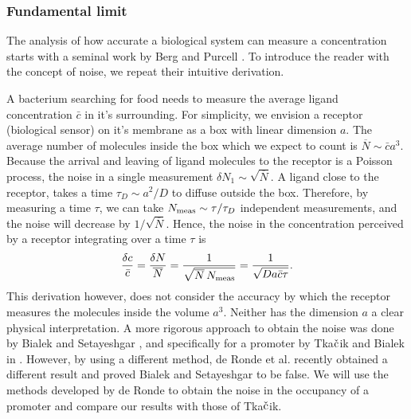 \subsubsection{Fundamental limit}
The analysis of how accurate a biological system can measure a concentration starts with a seminal work by Berg and Purcell \cite{Berg1977}. To introduce the reader with the concept of noise, we repeat their intuitive derivation. 

A bacterium searching for food needs to measure the average ligand concentration $\bar{c}$ in it's surrounding. For simplicity, we envision a receptor (biological sensor) on it's membrane as a box with linear dimension $a$. The average number of molecules inside the box which we expect to count is $\overline{N} \sim \bar{c} a^3$. Because the arrival and leaving of ligand molecules to the receptor is a Poisson process, the noise in a single measurement $\delta N_1 \sim \sqrt{\overline{N}}$. A ligand close to the receptor, takes a time $\tau_D \sim a^2/D$ to diffuse outside the box. Therefore, by measuring a time $\tau$, we can take $N_{\rm meas} \sim \tau/\tau_D$ independent measurements, and the noise will decrease by $1/\sqrt{\overline{N}}$. Hence, the noise in the concentration perceived by a receptor integrating over a time $\tau$ is
\begin{equation}
 \frac{\delta c}{\bar{c}} = \frac{\delta N}{\overline{N}} = \frac{1}{\sqrt{\overline{N}\,N_{\rm meas}}} = \frac{1}{\sqrt{D a \bar{c} \tau}}.
\end{equation}
This derivation however, does not consider the accuracy by which the receptor measures the molecules inside the volume $a^3$. Neither has the dimension $a$ a clear physical interpretation. A more rigorous approach to obtain the noise was done by Bialek and Setayeshgar \cite{Bialek2005}, and specifically for a promoter by Tka$\check{\rm c}$ik and Bialek in \cite{Tkacik2009}. However, by using a different method, de Ronde et al. recently obtained a different result \cite{DeRonde2012} and proved Bialek and Setayeshgar to be false. We will use the methods developed by de Ronde to obtain the noise in the occupancy of a promoter and compare our results with those of Tka$\check{\rm c}$ik.


